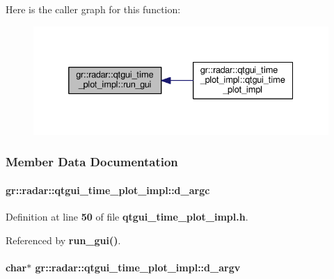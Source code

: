 Here is the caller graph for this function\+:
\nopagebreak
\begin{figure}[H]
\begin{center}
\leavevmode
\includegraphics[width=332pt]{d4/de4/classgr_1_1radar_1_1qtgui__time__plot__impl_a84e4bebd7d96eb01d7f456d9d6c2f578_icgraph}
\end{center}
\end{figure}




\subsubsection{Member Data Documentation}
\paragraph[{d\+\_\+argc}]{ gr\+::radar\+::qtgui\+\_\+time\+\_\+plot\+\_\+impl\+::d\+\_\+argc}\label{classgr_1_1radar_1_1qtgui__time__plot__impl_a748a8452a84651673b308ec0cd42e986}


Definition at line {\bf 50} of file {\bf qtgui\+\_\+time\+\_\+plot\+\_\+impl.\+h}.



Referenced by {\bf run\+\_\+gui()}.

\paragraph[{d\+\_\+argv}]{\setlength{\rightskip}{0pt plus 5cm}char$\ast$ gr\+::radar\+::qtgui\+\_\+time\+\_\+plot\+\_\+impl\+::d\+\_\+argv}\label{classgr_1_1radar_1_1qtgui__time__plot__impl_ac78304356e5e20e3d4b5ea741f4aabe9}


